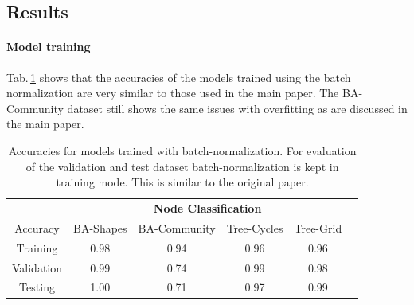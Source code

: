 \subsection{Results}
\paragraph{Model training}
Tab.\,\ref{tab:accuracies} shows that the accuracies of the models trained using the batch normalization are very similar to those used in the main paper. The BA-Community dataset still shows the same issues with overfitting as are discussed in the main paper. 

\begin{table}[]
\centering
\begin{tabular}{cccccc}
\toprule
&\multicolumn{4}{c}{\textbf{Node Classification}} \\
Accuracy & \multicolumn{1}{c}{BA-Shapes} & \multicolumn{1}{c}{BA-Community} & \multicolumn{1}{c}{Tree-Cycles} & \multicolumn{1}{c}{Tree-Grid}  \\ 
\midrule
Training & 0.98 & 0.94 & 0.96 & \multicolumn{1}{c}{0.96}  \\
Validation & 0.99 & 0.74 & 0.99 & \multicolumn{1}{c}{0.98}  \\
Testing & 1.00 & 0.71 & 0.97 & \multicolumn{1}{c}{0.99} &  \\
\bottomrule
\end{tabular}
\caption{Accuracies for models trained with batch-normalization. For evaluation of the validation and test dataset batch-normalization is kept in training mode. This is similar to the original paper. }
\label{tab:accuracies}
\end{table}

